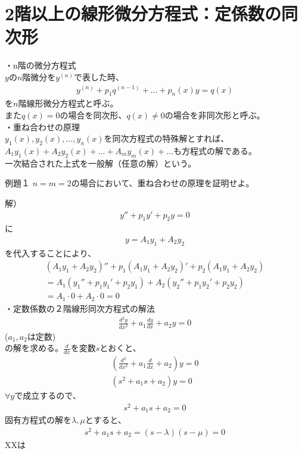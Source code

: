 \documentclass{jsarticle}
\begin{document}
\section{2階以上の線形微分方程式：定係数の同次形}
・n階の微分方程式\\
$y$の$n$階微分を$y^{(n)}$で表した時、
\begin{eqnarray}
y^{(n)}+p_1q^{(n-1)}+…+p_n(x)y=q(x)
\end{eqnarray}
を$n$階線形微分方程式と呼ぶ。\\
また$q(x)=0$の場合を同次形、$q(x)\neq 0$の場合を非同次形と呼ぶ。\\
・重ね合わせの原理\\
$y_1(x),y_2(x),…,y_n(x)$を同次方程式の特殊解とすれば、\\
$A_1y_1(x)+A_2y_2(x)+…+A_my_m(x)+…$も方程式の解である。\\
一次結合された上式を一般解（任意の解）という。
\begin{itembox}[l]{例題１}
$n=m=2$の場合において、重ね合わせの原理を証明せよ。
\end{itembox}
解）
\begin{eqnarray}
y''+p_1y'+p_2y=0
\end{eqnarray}
に
\begin{eqnarray}
y=A_1y_1+A_2y_2
\end{eqnarray}
を代入することにより、
\begin{eqnarray}
(A_1y_1+A_2y_2)''+p_1(A_1y_1+A_2y_2)'+p_2(A_1y_1+A_2y_2)\\
=A_1(y_1''+p_1y_1'+p_2y_1)+A_2(y_2''+p_1y_2'+p_2y_2)\\
=A_1\cdot 0+A_2\cdot 0 =0
\end{eqnarray}
・定数係数の２階線形同次方程式の解法
\begin{eqnarray}
\frac{d^2y}{dx^2}+a_1\frac{dy}{dx}+a_2y=0
\end{eqnarray}
($a_1,a_2$は定数)\\
の解を求める。$\frac{d}{dx}$を変数$s$とおくと、
\begin{eqnarray}
\left(\frac{d^2}{dx^2}+a_1\frac{d}{dx}+a_2\right)y=0\\
(s^2+a_1s+a_2)y=0
\end{eqnarray}
$\forall y$で成立するので、
\begin{eqnarray}
s^2+a_1s+a_2=0
\end{eqnarray}
固有方程式の解を$\lambda,\mu$とすると、
\begin{eqnarray}
s^2+a_1s+a_2=(s-\lambda)(s-\mu)=0
\end{eqnarray}
XXは
\end{document}

